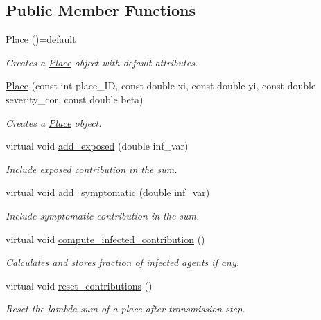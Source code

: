 \subsection*{Public Member Functions}
\begin{DoxyCompactItemize}
\item 
\hyperlink{classPlace_ad90eb4021d4c3431e062b3425ed3f05c}{Place} ()=default
\begin{DoxyCompactList}\small\item\em Creates a \hyperlink{classPlace}{Place} object with default attributes. \end{DoxyCompactList}\item 
\hyperlink{classPlace_a4a2f79e0414591c81a2161e055a24ec6}{Place} (const int place\+\_\+\+ID, const double xi, const double yi, const double severity\+\_\+cor, const double beta)
\begin{DoxyCompactList}\small\item\em Creates a \hyperlink{classPlace}{Place} object. \end{DoxyCompactList}\item 
virtual void \hyperlink{classPlace_a96444ff0aa08a921598d0afb9c00cec8}{add\+\_\+exposed} (double inf\+\_\+var)
\begin{DoxyCompactList}\small\item\em Include exposed contribution in the sum. \end{DoxyCompactList}\item 
virtual void \hyperlink{classPlace_a5216539c8589d41aad430513740fa15c}{add\+\_\+symptomatic} (double inf\+\_\+var)
\begin{DoxyCompactList}\small\item\em Include symptomatic contribution in the sum. \end{DoxyCompactList}\item 
virtual void \hyperlink{classPlace_aeb4c561e8bc4e1ae7186baed6ef1aa47}{compute\+\_\+infected\+\_\+contribution} ()
\begin{DoxyCompactList}\small\item\em Calculates and stores fraction of infected agents if any. \end{DoxyCompactList}\item 
virtual void \hyperlink{classPlace_abc1e560ef8aaaad565ccceb9540e5bd8}{reset\+\_\+contributions} ()
\begin{DoxyCompactList}\small\item\em Reset the lambda sum of a place after transmission step. \end{DoxyCompactList}\item 

\end{DoxyCompactItemize}
